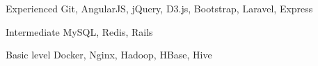 \documentclass[fontsize=10pt]{tccv}
\begin{document}
\begin{factlist}

\item{Experienced}
     {Git, AngularJS, jQuery, D3.js, Bootstrap, Laravel, Express}

\item{Intermediate}
     {MySQL, Redis, Rails}


\item{Basic level}
     {Docker, Nginx, Hadoop, HBase, Hive}

\end{factlist}

\end{document}
